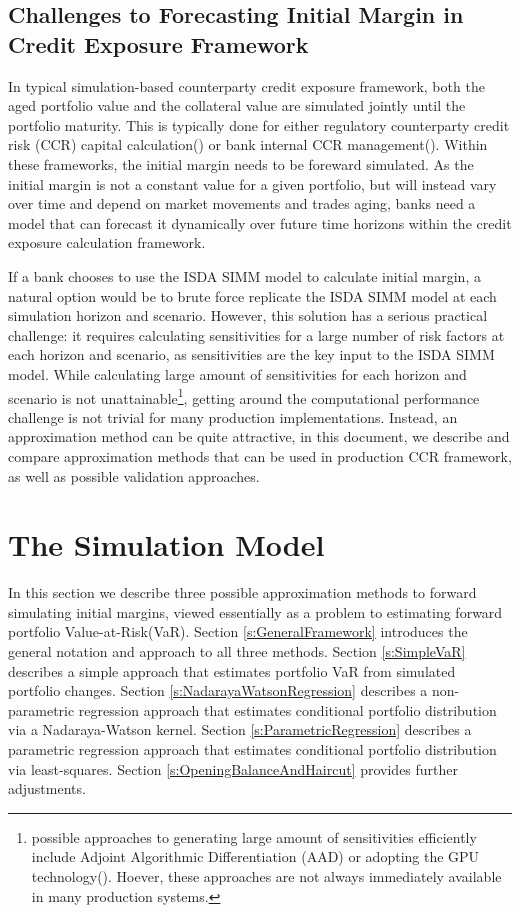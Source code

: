 \documentclass[preprint,12pt]{elsarticle}
\begin{document}
\subsection{Challenges to Forecasting Initial Margin in Credit Exposure Framework}

In typical simulation-based counterparty credit exposure framework, both the aged portfolio value and the collateral value are simulated jointly until the portfolio maturity. This is typically done for either regulatory counterparty credit risk (CCR) capital calculation(\cite{Basel2011BaselIII}) or bank internal CCR management(\cite{gregory2012Counterparty}). Within these frameworks, the initial margin needs to be foreward simulated. As the initial margin is not a constant value for a given portfolio, but will instead vary over time and depend on market movements and trades aging, banks need a model that can forecast it dynamically over future time horizons within the credit exposure calculation framework.

If a bank chooses to use the ISDA SIMM model to calculate initial margin, a natural option would be to brute force replicate the ISDA SIMM model at each simulation horizon and scenario. However, this solution has a serious practical challenge: it requires calculating sensitivities for a large number of risk factors at each horizon and scenario, as sensitivities are the key input to the ISDA SIMM model. While calculating large amount of sensitivities for each horizon and scenario is not unattainable\footnote{possible approaches to generating large amount of sensitivities efficiently include Adjoint Algorithmic Differentiation (AAD) or adopting the GPU technology(\cite{risk2015AADGPU}). Hoever, these approaches are not always immediately available in many production systems.}, getting around the computational performance challenge is not trivial for many production implementations. Instead, an approximation method can be quite attractive, in this document, we describe and compare approximation methods that can be used in production CCR framework, as well as possible validation approaches.

\section{The Simulation Model} \label{sec:model}

In this section we describe three possible approximation methods to forward simulating initial margins, viewed essentially as a problem to estimating forward portfolio Value-at-Risk(VaR). Section \ref{s:GeneralFramework} introduces the general notation and approach to all three methods. Section \ref{s:SimpleVaR} describes a simple approach that estimates portfolio VaR from simulated portfolio changes. Section \ref{s:NadarayaWatsonRegression} describes a non-parametric regression approach that estimates conditional portfolio distribution via a Nadaraya-Watson kernel. Section \ref{s:ParametricRegression} describes a parametric regression approach that estimates conditional portfolio distribution via least-squares. Section \ref{s:OpeningBalanceAndHaircut} provides further adjustments.
\end{document}
